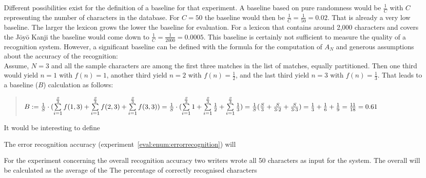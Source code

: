 Different possibilities exist for the definition of a baseline for that 
experiment. A baseline based on pure randomness would be \(\frac{1}{C}\) with
\(C\) representing the number of characters in the database. For \(C = 50\) 
the baseline would then be \(\frac{1}{C} = \frac{1}{50} = 0.02\).
That is already a very low baseline. The larger the lexicon grows the
lower the baseline for evaluation. For a lexicon that contains around 2,000 
characters and covers the Jōyō Kanji the baseline would come down to
\(\frac{1}{C} = \frac{1}{2000} = 0.0005\).
This baseline is certainly not sufficient to measure the quality of a 
recognition system. However, a significant baseline can be defined 
with the formula for the computation of \(A_N\) and generous assumptions
about the accuracy of the recognition: \\
Assume, \(N = 3\) and all the sample characters are among the first three 
matches in the list of matches, equally partitioned.
Then one third would yield \(n = 1\) with \(f(n) = 1\),
another third yield \(n = 2\) with \(f(n) = \frac{1}{2}\),
and the last third yield \(n = 3\) with \(f(n) = \frac{1}{3}\).
That leads to a baseline (\(B\)) calculation as follows:
\begin{quote}
  \(
    B := \frac{1}{S} \cdot (\sum\limits_{i=1}^{\frac{S}{3}}{f(1,3)} + \sum\limits_{i=1}^{\frac{S}{3}}{f(2,3)} + \sum\limits_{i=1}^{\frac{S}{3}}{f(3,3)}) \\
       = \frac{1}{S} \cdot (\sum\limits_{i=1}^{\frac{S}{3}}{1} + \sum\limits_{i=1}^{\frac{S}{3}}{\frac{1}{2}} + \sum\limits_{i=1}^{\frac{S}{3}}{\frac{1}{3}}) \\
       = \frac{1}{S} (\frac{S}{3} + \frac{S}{3 \cdot 2} + \frac{S}{3 \cdot 3}) 
       = \frac{1}{3} + \frac{1}{6} + \frac{1}{9}
       = \frac{11}{18} = 0.61
  \)
\end{quote}

It would be interesting to define

The error recognition accuracy (experiment~\ref{eval:enum:errorrecognition}) 
will 

        For the experiment concerning the overall recognition accuracy 
        two writers wrote all 50 characters as input for the system.
        The overall will be calculated as the average of the 
        The percentage of correctly recognised characters






